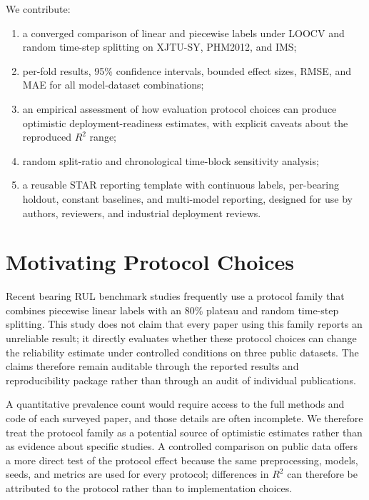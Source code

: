 \documentclass[pdflatex,sn-mathphys-num]{sn-jnl}
\begin{document}
We contribute:
\begin{enumerate}
    \item a converged comparison of linear and piecewise labels under LOOCV and random time-step splitting on XJTU-SY, PHM2012, and IMS;
    \item per-fold results, 95\% confidence intervals, bounded effect sizes, RMSE, and MAE for all model-dataset combinations;
    \item an empirical assessment of how evaluation protocol choices can produce optimistic deployment-readiness estimates, with explicit caveats about the reproduced $R^2$ range;
    \item random split-ratio and chronological time-block sensitivity analysis;
    \item a reusable STAR reporting template with continuous labels, per-bearing holdout, constant baselines, and multi-model reporting, designed for use by authors, reviewers, and industrial deployment reviews.
\end{enumerate}

\section{Motivating Protocol Choices}
Recent bearing RUL benchmark studies frequently use a protocol family that combines piecewise linear labels with an 80\% plateau and random time-step splitting. This study does not claim that every paper using this family reports an unreliable result; it directly evaluates whether these protocol choices can change the reliability estimate under controlled conditions on three public datasets. The claims therefore remain auditable through the reported results and reproducibility package rather than through an audit of individual publications.

A quantitative prevalence count would require access to the full methods and code of each surveyed paper, and those details are often incomplete. We therefore treat the protocol family as a potential source of optimistic estimates rather than as evidence about specific studies. A controlled comparison on public data offers a more direct test of the protocol effect because the same preprocessing, models, seeds, and metrics are used for every protocol; differences in $R^2$ can therefore be attributed to the protocol rather than to implementation choices.
\end{document}
